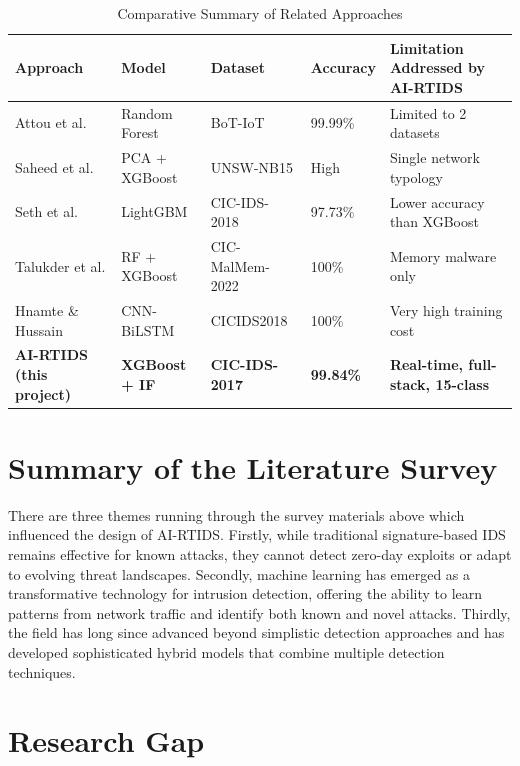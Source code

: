 \documentclass[12pt,a4paper]{report}
\begin{document}
\begin{table}[htbp]
\centering
\caption{Comparative Summary of Related Approaches}
\label{tab:comparative_related_work}
\renewcommand{\arraystretch}{1.4}
\setlength{\tabcolsep}{3pt}

\begin{tabularx}{\textwidth}{|p{3.0cm}|p{2.5cm}|p{2.5cm}|p{2.5cm}|X|}
\hline
\textbf{Approach} & \textbf{Model} & \textbf{Dataset} & \textbf{Accuracy} & \textbf{Limitation Addressed by AI-RTIDS} \\
\hline
Attou et al. & Random Forest & BoT-IoT & 99.99\% & Limited to 2 datasets \\
\hline
Saheed et al. & PCA + XGBoost & UNSW-NB15 & High & Single network typology \\
\hline
Seth et al. & LightGBM & CIC-IDS-2018 & 97.73\% & Lower accuracy than XGBoost \\
\hline
Talukder et al. & RF + XGBoost & CIC-MalMem-2022 & 100\% & Memory malware only \\
\hline
Hnamte \& Hussain & CNN-BiLSTM & CICIDS2018 & 100\% & Very high training cost \\
\hline
\textbf{AI-RTIDS (this project)} & \textbf{XGBoost + IF} & \textbf{CIC-IDS-2017} & \textbf{99.84\%} & \textbf{Real-time, full-stack, 15-class} \\
\hline
\end{tabularx}
\end{table}

\section{Summary of the Literature Survey}

There are three themes running through the survey materials above which influenced the design of AI-RTIDS. Firstly, while traditional signature-based IDS remains effective for known attacks, they cannot detect zero-day exploits or adapt to evolving threat landscapes. Secondly, machine learning has emerged as a transformative technology for intrusion detection, offering the ability to learn patterns from network traffic and identify both known and novel attacks. Thirdly, the field has long since advanced beyond simplistic detection approaches and has developed sophisticated hybrid models that combine multiple detection techniques.

\section{Research Gap}
\end{document}
